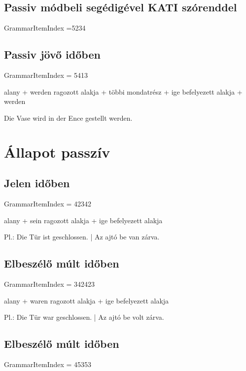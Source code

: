 \documentclass{article}
\newenvironment{desc}{\verbatim}{\endverbatim}
\begin{document}
\subsection{Passiv módbeli segédigével KATI szórenddel}

GrammarItemIndex =5234

\subsection{Passiv jövő időben}

GrammarItemIndex = 5413

\begin{desc}
alany + werden ragozott alakja + többi mondatrész + ige befelyezett alakja + werden

Die Vase wird in der Ence gestellt werden.
\end{desc}

\section{Állapot passzív}

\subsection{Jelen időben}

GrammarItemIndex = 42342

\begin{desc}
alany + sein ragozott alakja + ige befelyezett alakja

Pl.: Die Tür ist geschlossen. | Az ajtó be van zárva.
\end{desc}

\subsection{Elbeszélő múlt időben}

GrammarItemIndex = 342423

\begin{desc}
alany + waren ragozott alakja + ige befelyezett alakja

Pl.: Die Tür war geschlossen. | Az ajtó be volt zárva.
\end{desc}

\subsection{Elbeszélő múlt időben}

GrammarItemIndex = 45353
\end{document}

